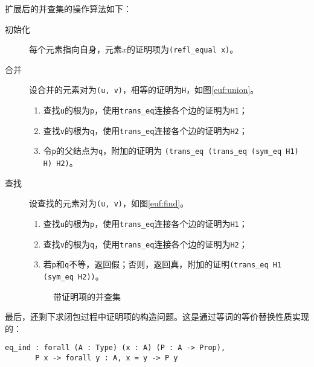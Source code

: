 扩展后的并查集的操作算法如下：
\begin{description}
  \item[初始化] 每个元素指向自身，元素$x$的证明项为\texttt{(refl\_equal x)}。
  \item[合并] 设合并的元素对为\texttt{(u, v)}，相等的证明为\texttt{H}，如图\ref{euf:union}。
    \begin{enumerate}
      \item 查找\texttt{u}的根为\texttt{p}，使用\texttt{trans\_eq}连接各个边的证明为\texttt{H1}；
      \item 查找\texttt{v}的根为\texttt{q}，使用\texttt{trans\_eq}连接各个边的证明为\texttt{H2}；
      \item 令\texttt{p}的父结点为\texttt{q}，附加的证明为
        \texttt{(trans\_eq (trans\_eq (sym\_eq H1) H) H2)}。
    \end{enumerate}
  \item[查找] 设查找的元素对为\texttt{(u, v)}，如图\ref{euf:find}。
    \begin{enumerate}
      \item 查找\texttt{u}的根为\texttt{p}，使用\texttt{trans\_eq}连接各个边的证明为\texttt{H1}；
      \item 查找\texttt{v}的根为\texttt{q}，使用\texttt{trans\_eq}连接各个边的证明为\texttt{H2}；
      \item 若\texttt{p}和\texttt{q}不等，返回假；否则，返回真，附加的证明\texttt{(trans\_eq H1 (sym\_eq H2))}。
    \end{enumerate}

\begin{figure}[!h]
\centering
{}
\caption{带证明项的并查集}
\end{figure}
\end{description}

最后，还剩下求闭包过程中证明项的构造问题。这是通过等词的等价替换性质实现的：
\begin{verbatim}
eq_ind : forall (A : Type) (x : A) (P : A -> Prop),
       P x -> forall y : A, x = y -> P y
\end{verbatim}
